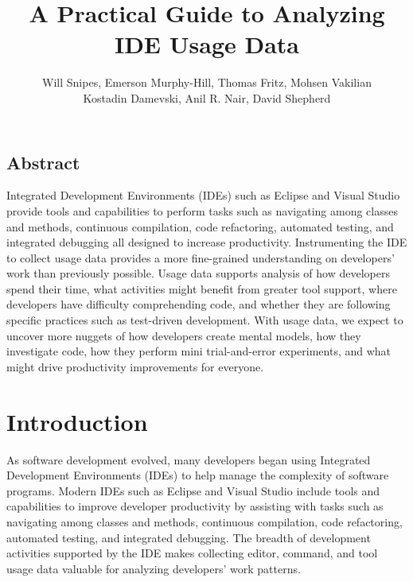 \documentclass[authoryear]{elsarticle}
\begin{document}
%
\title{A Practical Guide to Analyzing IDE Usage Data\vspace{-0ex}}

\author{
Will Snipes, Emerson Murphy-Hill,
Thomas Fritz, Mohsen Vakilian \\
Kostadin Damevski,
Anil R. Nair, David Shepherd
}
\maketitle
\thispagestyle{empty}
\pagestyle{empty}

\begin{center}
\section*{Abstract}
\end{center}
Integrated Development Environments (IDEs) such as Eclipse and Visual Studio provide tools and capabilities to perform tasks such as navigating among classes and methods, continuous compilation, code refactoring, automated testing, and integrated debugging all designed to increase productivity.  Instrumenting the IDE to collect usage data provides a more fine-grained understanding on developers' work than previously possible.  Usage data supports analysis of how developers spend their time, what activities might benefit from greater tool support, where developers have difficulty comprehending code, and whether they are following specific practices such as test-driven development.  With usage data, we expect to uncover more nuggets of how developers create mental models, how they investigate code, how they perform mini trial-and-error experiments, and what might drive productivity improvements for everyone.

\section{Introduction}
As software development evolved, many developers began using Integrated Development Environments (IDEs) to help manage the complexity of software programs.  Modern IDEs such as Eclipse and Visual Studio include tools and capabilities to improve developer productivity by assisting with tasks such as navigating among classes and methods, continuous compilation, code refactoring, automated testing, and integrated debugging.  The breadth of development activities supported by the IDE makes collecting editor, command, and tool usage data valuable for analyzing developers' work patterns.  
\end{document}
